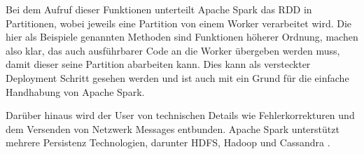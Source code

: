 Bei dem Aufruf dieser Funktionen unterteilt Apache Spark das RDD in Partitionen, wobei jeweils eine Partition von einem Worker verarbeitet wird.
Die hier als Beispiele genannten Methoden sind Funktionen höherer Ordnung, machen also klar, das auch ausführbarer Code an die Worker übergeben werden muss, damit dieser seine Partition abarbeiten kann.
Dies kann als versteckter Deployment Schritt gesehen werden und ist auch mit ein Grund für die einfache Handhabung von Apache Spark.

Darüber hinaus wird der User von technischen Details wie Fehlerkorrekturen und dem Versenden von Netzwerk Messages entbunden.
Apache  Spark unterstützt mehrere Persistenz Technologien, darunter HDFS, Hadoop und Cassandra \cite{zaharia2012resilient}.
